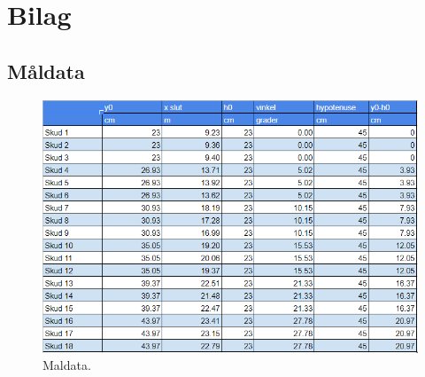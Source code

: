 \section*{Bilag}
\subsection*{Måldata}

\begin{figure}[H]
\centering
\includegraphics[scale=1.0, angle = 90]{Billeder/Maeldata.png}
\caption{Maldata.}
\label{fig:Maeldata}
\end{figure}


